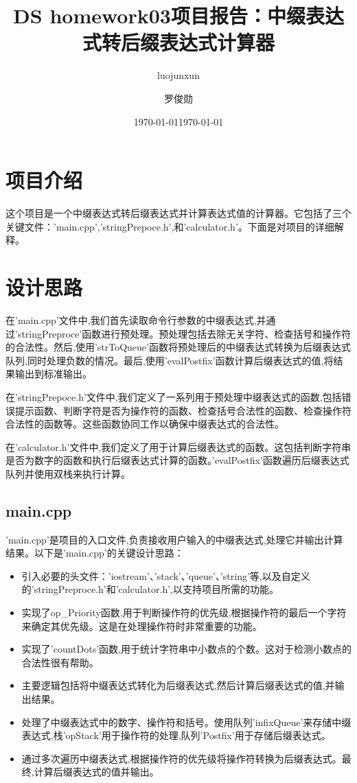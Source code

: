 \documentclass[12pt, a4paper, oneside]{ctexart}
\title{\huge\textbf{DS homework03}}
\author{luojunxun}
\date{\today}
\begin{document}
\title{项目报告：中缀表达式转后缀表达式计算器}
\author{罗俊勋}
\date{\today}
\maketitle

\section{项目介绍}
这个项目是一个中缀表达式转后缀表达式并计算表达式值的计算器。它包括了三个关键文件：'main.cpp','stringPrepoce.h',和'calculator.h'。下面是对项目的详细解释。

\section{设计思路}
在'main.cpp'文件中,我们首先读取命令行参数的中缀表达式,并通过'stringPreproce'函数进行预处理。预处理包括去除无关字符、检查括号和操作符的合法性。然后,使用'strToQueue'函数将预处理后的中缀表达式转换为后缀表达式队列,同时处理负数的情况。最后,使用'evalPostfix'函数计算后缀表达式的值,将结果输出到标准输出。

在'stringPrepoce.h'文件中,我们定义了一系列用于预处理中缀表达式的函数,包括错误提示函数、判断字符是否为操作符的函数、检查括号合法性的函数、检查操作符合法性的函数等。这些函数协同工作以确保中缀表达式的合法性。

在'calculator.h'文件中,我们定义了用于计算后缀表达式的函数。这包括判断字符串是否为数字的函数和执行后缀表达式计算的函数。'evalPostfix'函数遍历后缀表达式队列并使用双栈来执行计算。

\subsection{main.cpp}
'main.cpp'是项目的入口文件,负责接收用户输入的中缀表达式,处理它并输出计算结果。以下是'main.cpp'的关键设计思路：

\begin{itemize}
\item 引入必要的头文件：'iostream'、'stack'、'queue'、'string'等,以及自定义的'stringPreproce.h'和'calculator.h',以支持项目所需的功能。

\item 实现了op\_Priority函数,用于判断操作符的优先级,根据操作符的最后一个字符来确定其优先级。这是在处理操作符时非常重要的功能。

\item 实现了'countDots'函数,用于统计字符串中小数点的个数。这对于检测小数点的合法性很有帮助。

\item 主要逻辑包括将中缀表达式转化为后缀表达式,然后计算后缀表达式的值,并输出结果。

\item 处理了中缀表达式中的数字、操作符和括号。使用队列'infixQueue'来存储中缀表达式,栈'opStack'用于操作符的处理,队列'Postfix'用于存储后缀表达式。

\item 通过多次遍历中缀表达式,根据操作符的优先级将操作符转换为后缀表达式。最终,计算后缀表达式的值并输出。

\end{itemize}
\end{document}
